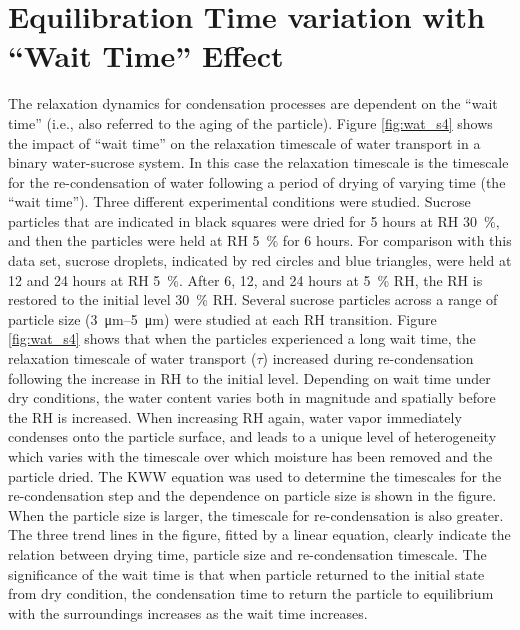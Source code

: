 \section{Equilibration Time variation with ``Wait Time'' Effect}
The relaxation dynamics for condensation processes are dependent on the ``wait time'' (i.e., also referred to the aging of the particle). Figure \ref{fig:wat_s4} shows the impact of ``wait time'' on the relaxation timescale of water transport in a binary water-sucrose system. In this case the relaxation timescale is the timescale for the re-condensation of water following a period of drying of varying time (the ``wait time''). Three different experimental conditions were studied. Sucrose particles that are indicated in black squares were dried for \num{5} hours at RH \SI{30}{\percent}, and then the particles were held at RH \SI{5}{\percent} for \num{6} hours. For comparison with this data set, sucrose droplets, indicated by red circles and blue triangles, were held at \num{12} and \num{24} hours at RH \SI{5}{\percent}. After \num{6}, \num{12}, and \num{24} hours at \SI{5}{\percent} RH, the RH is restored to the initial level \SI{30}{\percent} RH. Several sucrose particles across a range of particle size (\SIrange[range-phrase=--]{3}{5}{\micro\meter}) were studied at each RH transition. Figure \ref{fig:wat_s4} shows that when the particles experienced a long wait time, the relaxation timescale of water transport ($\tau$) increased during re-condensation following the increase in RH to the initial level. Depending on wait time under dry conditions, the water content varies both in magnitude and spatially before the RH is increased\cite{Rickards2015}. When increasing RH again, water vapor immediately condenses onto the particle surface, and leads to a unique level of heterogeneity which varies with the timescale over which moisture has been removed and the particle dried\cite{Rickards2015,luTimescalesWaterTransport2014}. The KWW equation was used to determine the timescales for the re-condensation step and the dependence on particle size is shown in the figure. When the particle size is larger, the timescale for re-condensation is also greater. The three trend lines in the figure, fitted by a linear equation, clearly indicate the relation between drying time, particle size and re-condensation timescale. The significance of the wait time is that when particle returned to the initial state from dry condition, the condensation time to return the particle to equilibrium with the surroundings increases as the wait time increases. 



